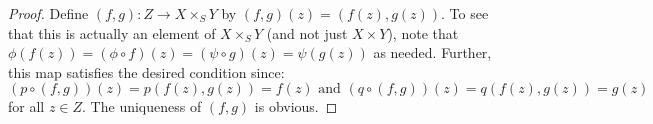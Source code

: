 \begin{proof}
	Define $(f,g) : Z \to X \times_S Y$ by $(f,g)(z) = (f(z),g(z))$. To see that this is actually an element of $X \times_S Y$ (and not just $X \times Y$), note that $\phi(f(z)) = (\phi \circ f)(z) = (\psi \circ g)(z) = \psi(g(z))$ as needed. Further, this map satisfies the desired condition since:
	\[ (p \circ (f,g))(z) = p(f(z),g(z)) = f(z) \text{ and } (q \circ (f,g))(z) = q(f(z),g(z)) = g(z) \]
	for all $z \in Z$. The uniqueness of $(f,g)$ is obvious.
\end{proof}
